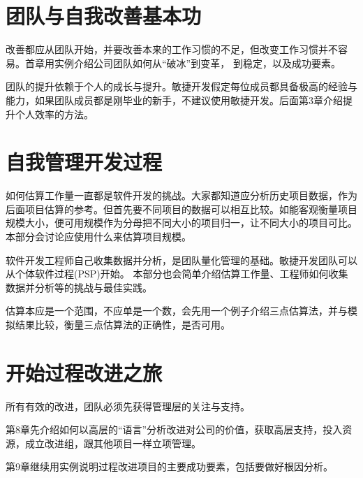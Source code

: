 \documentclass{book}        %
\begin{document}


\part{团队与自我改善基本功}改善都应从团队开始，并要改善本来的工作习惯的不足，但改变工作习惯并不容易。首章用实例介绍公司团队如何从“破冰”到变革， 到稳定，以及成功要素。

团队的提升依赖于个人的成长与提升。敏捷开发假定每位成员都具备极高的经验与能力，如果团队成员都是刚毕业的新手，不建议使用敏捷开发。后面第3章介绍提升个人效率的方法。 




\part{自我管理开发过程}如何估算工作量一直都是软件开发的挑战。大家都知道应分析历史项目数据，作为后面项目估算的参考。但首先要不同项目的数据可以相互比较。如能客观衡量项目规模大小，便可用规模作为分母把不同大小的项目归一，让不同大小的项目可比。本部分会讨论应使用什么来估算项目规模。

软件开发工程师自己收集数据并分析，是团队量化管理的基础。敏捷开发团队可以从个体软件过程(PSP)开始。 本部分也会简单介绍估算工作量、工程师如何收集数据并分析等的挑战与最佳实践。

估算本应是一个范围，不应单是一个数，会先用一个例子介绍三点估算法，并与模拟结果比较，衡量三点估算法的正确性，是否可用。 
















\part{开始过程改进之旅}所有有效的改进，团队必须先获得管理层的关注与支持。

第8章先介绍如何以高层的“语言”分析改进对公司的价值，获取高层支持，投入资源，成立改进组，跟其他项目一样立项管理。

第9章继续用实例说明过程改进项目的主要成功要素，包括要做好根因分析。 


\end{document}
